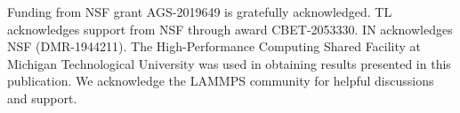 \documentclass[journal abbreviation, manuscript]{copernicus}
\begin{document}


\begin{acknowledgements}
Funding from NSF grant AGS-2019649 is gratefully acknowledged. TL acknowledges support from NSF through award CBET-2053330. IN acknowledges NSF (DMR-1944211). The High-Performance Computing Shared Facility at Michigan Technological University was used in obtaining results presented in this publication. We acknowledge the LAMMPS community for helpful discussions and support.
\end{acknowledgements}

%


\end{document}
